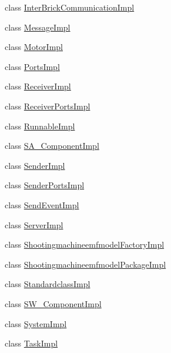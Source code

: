 \begin{DoxyCompactItemize}
class \hyperlink{classshootingmachineemfmodel_1_1impl_1_1_inter_brick_communication_impl}{Inter\-Brick\-Communication\-Impl}
\item 
class \hyperlink{classshootingmachineemfmodel_1_1impl_1_1_message_impl}{Message\-Impl}
\item 
class \hyperlink{classshootingmachineemfmodel_1_1impl_1_1_motor_impl}{Motor\-Impl}
\item 
class \hyperlink{classshootingmachineemfmodel_1_1impl_1_1_ports_impl}{Ports\-Impl}
\item 
class \hyperlink{classshootingmachineemfmodel_1_1impl_1_1_receiver_impl}{Receiver\-Impl}
\item 
class \hyperlink{classshootingmachineemfmodel_1_1impl_1_1_receiver_ports_impl}{Receiver\-Ports\-Impl}
\item 
class \hyperlink{classshootingmachineemfmodel_1_1impl_1_1_runnable_impl}{Runnable\-Impl}
\item 
class \hyperlink{classshootingmachineemfmodel_1_1impl_1_1_s_a___component_impl}{S\-A\-\_\-\-Component\-Impl}
\item 
class \hyperlink{classshootingmachineemfmodel_1_1impl_1_1_sender_impl}{Sender\-Impl}
\item 
class \hyperlink{classshootingmachineemfmodel_1_1impl_1_1_sender_ports_impl}{Sender\-Ports\-Impl}
\item 
class \hyperlink{classshootingmachineemfmodel_1_1impl_1_1_send_event_impl}{Send\-Event\-Impl}
\item 
class \hyperlink{classshootingmachineemfmodel_1_1impl_1_1_server_impl}{Server\-Impl}
\item 
class \hyperlink{classshootingmachineemfmodel_1_1impl_1_1_shootingmachineemfmodel_factory_impl}{Shootingmachineemfmodel\-Factory\-Impl}
\item 
class \hyperlink{classshootingmachineemfmodel_1_1impl_1_1_shootingmachineemfmodel_package_impl}{Shootingmachineemfmodel\-Package\-Impl}
\item 
class \hyperlink{classshootingmachineemfmodel_1_1impl_1_1_standardclass_impl}{Standardclass\-Impl}
\item 
class \hyperlink{classshootingmachineemfmodel_1_1impl_1_1_s_w___component_impl}{S\-W\-\_\-\-Component\-Impl}
\item 
class \hyperlink{classshootingmachineemfmodel_1_1impl_1_1_system_impl}{System\-Impl}
\item 
class \hyperlink{classshootingmachineemfmodel_1_1impl_1_1_task_impl}{Task\-Impl}
\end{DoxyCompactItemize}
